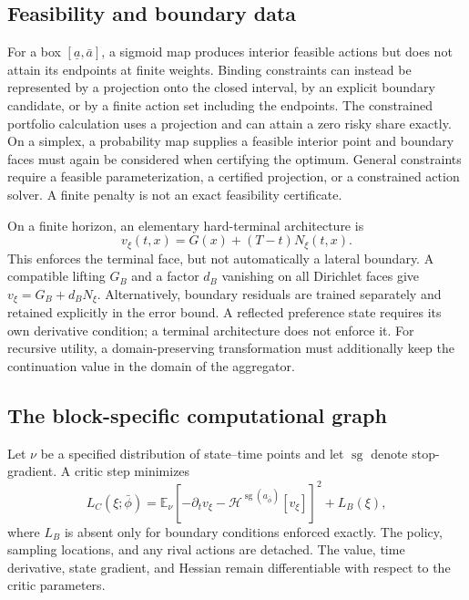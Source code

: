 \documentclass[ecta,nameyear,draft]{econsocart}
\theoremstyle{definition}
\theoremstyle{remark}
\newcommand{\E}{\mathbb E}
\newcommand{\HH}{\mathcal H}
\newcommand{\sg}{\operatorname{sg}}
\begin{document}
\subsection{Feasibility and boundary data}
For a box $[\underline a,\bar a]$, a sigmoid map produces interior feasible actions but does not attain its endpoints at finite weights. Binding constraints can instead be represented by a projection onto the closed interval, by an explicit boundary candidate, or by a finite action set including the endpoints. The constrained portfolio calculation uses a projection and can attain a zero risky share exactly. On a simplex, a probability map supplies a feasible interior point and boundary faces must again be considered when certifying the optimum. General constraints require a feasible parameterization, a certified projection, or a constrained action solver. A finite penalty is not an exact feasibility certificate.

On a finite horizon, an elementary hard-terminal architecture is
\begin{equation}\label{eq:terminal}
 v_\xi(t,x)=G(x)+(T-t)N_\xi(t,x).
\end{equation}
This enforces the terminal face, but not automatically a lateral boundary. A compatible lifting $G_B$ and a factor $d_B$ vanishing on all Dirichlet faces give $v_\xi=G_B+d_BN_\xi$. Alternatively, boundary residuals are trained separately and retained explicitly in the error bound. A reflected preference state requires its own derivative condition; a terminal architecture does not enforce it. For recursive utility, a domain-preserving transformation must additionally keep the continuation value in the domain of the aggregator.

\subsection{The block-specific computational graph}
Let $\nu$ be a specified distribution of state--time points and let $\sg$ denote stop-gradient. A critic step minimizes
\begin{equation}\label{eq:criticloss}
 L_C(\xi;\bar\phi)=\E_\nu\left[-\partial_t v_\xi-
                 \HH^{\sg(a_{\bar\phi})}[v_\xi]\right]^2+L_B(\xi),
\end{equation}
where $L_B$ is absent only for boundary conditions enforced exactly. The policy, sampling locations, and any rival actions are detached. The value, time derivative, state gradient, and Hessian remain differentiable with respect to the critic parameters.
\end{document}

